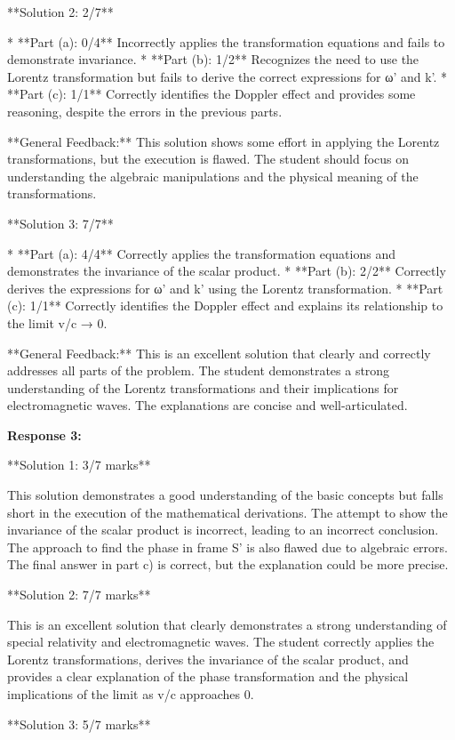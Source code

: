 \documentclass[a4paper,11pt]{article}
\begin{document}
**Solution 2: 2/7**

*   **Part (a): 0/4**  Incorrectly applies the transformation equations and fails to demonstrate invariance.
*   **Part (b): 1/2** Recognizes the need to use the Lorentz transformation but fails to derive the correct expressions for ω' and k'.
*   **Part (c): 1/1** Correctly identifies the Doppler effect and provides some reasoning, despite the errors in the previous parts.

**General Feedback:** This solution shows some effort in applying the Lorentz transformations, but the execution is flawed. The student should focus on understanding the algebraic manipulations and the physical meaning of the transformations.

**Solution 3: 7/7**

*   **Part (a): 4/4** Correctly applies the transformation equations and demonstrates the invariance of the scalar product.
*   **Part (b): 2/2**  Correctly derives the expressions for ω' and k' using the Lorentz transformation.
*   **Part (c): 1/1**  Correctly identifies the Doppler effect and explains its relationship to the limit v/c → 0.

**General Feedback:** This is an excellent solution that clearly and correctly addresses all parts of the problem. The student demonstrates a strong understanding of the Lorentz transformations and their implications for electromagnetic waves. The explanations are concise and well-articulated.


\textbf{Response 3:}

**Solution 1: 3/7 marks**

This solution demonstrates a good understanding of the basic concepts but falls short in the execution of the mathematical derivations. The attempt to show the invariance of the scalar product is incorrect, leading to an incorrect conclusion. The approach to find the phase in frame S' is also flawed due to algebraic errors. The final answer in part c) is correct, but the explanation could be more precise.

**Solution 2: 7/7 marks**

This is an excellent solution that clearly demonstrates a strong understanding of special relativity and electromagnetic waves. The student correctly applies the Lorentz transformations, derives the invariance of the scalar product, and provides a clear explanation of the phase transformation and the physical implications of the limit as v/c approaches 0.

**Solution 3: 5/7 marks**
\end{document}
